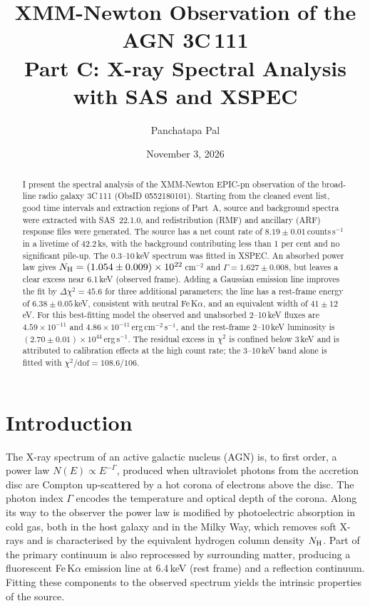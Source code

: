 \documentclass[11pt,a4paper]{article}
\title{XMM-Newton Observation of the AGN 3C\,111\\[4pt]
\large Part C: X-ray Spectral Analysis with SAS and XSPEC}
\author{Panchatapa Pal}
\date{November 3, 2026}
\newcommand{\nh}{N_{\rm H}}
\newcommand{\cgs}{erg\,cm$^{-2}$\,s$^{-1}$}
\begin{document}
\maketitle

\begin{abstract}
I present the spectral analysis of the XMM-Newton EPIC-pn observation of the broad-line radio galaxy 3C\,111 (ObsID 0552180101). Starting from the cleaned event list, good time intervals and extraction regions of Part~A, source and background spectra were extracted with SAS~22.1.0, and redistribution (RMF) and ancillary (ARF) response files were generated. The source has a net count rate of $8.19\pm0.01$\,counts\,s$^{-1}$ in a livetime of 42.2\,ks, with the background contributing less than 1 per cent and no significant pile-up. The 0.3--10\,keV spectrum was fitted in XSPEC. An absorbed power law gives $\nh=(1.054\pm0.009)\times10^{22}$\,cm$^{-2}$ and $\Gamma=1.627\pm0.008$, but leaves a clear excess near 6.1\,keV (observed frame). Adding a Gaussian emission line improves the fit by $\Delta\chi^2=45.6$ for three additional parameters; the line has a rest-frame energy of $6.38\pm0.05$\,keV, consistent with neutral Fe\,K$\alpha$, and an equivalent width of $41\pm12$\,eV. For this best-fitting model the observed and unabsorbed 2--10\,keV fluxes are $4.59\times10^{-11}$ and $4.86\times10^{-11}$\,\cgs, and the rest-frame 2--10\,keV luminosity is $(2.70\pm0.01)\times10^{44}$\,erg\,s$^{-1}$. The residual excess in $\chi^2$ is confined below 3\,keV and is attributed to calibration effects at the high count rate; the 3--10\,keV band alone is fitted with $\chi^2/\mathrm{dof}=108.6/106$.
\end{abstract}

\tableofcontents

\section{Introduction}

The X-ray spectrum of an active galactic nucleus (AGN) is, to first order, a power law $N(E)\propto E^{-\Gamma}$, produced when ultraviolet photons from the accretion disc are Compton up-scattered by a hot corona of electrons above the disc. The photon index $\Gamma$ encodes the temperature and optical depth of the corona. Along its way to the observer the power law is modified by photoelectric absorption in cold gas, both in the host galaxy and in the Milky Way, which removes soft X-rays and is characterised by the equivalent hydrogen column density $\nh$. Part of the primary continuum is also reprocessed by surrounding matter, producing a fluorescent Fe\,K$\alpha$ emission line at 6.4\,keV (rest frame) and a reflection continuum. Fitting these components to the observed spectrum yields the intrinsic properties of the source.
\end{document}
